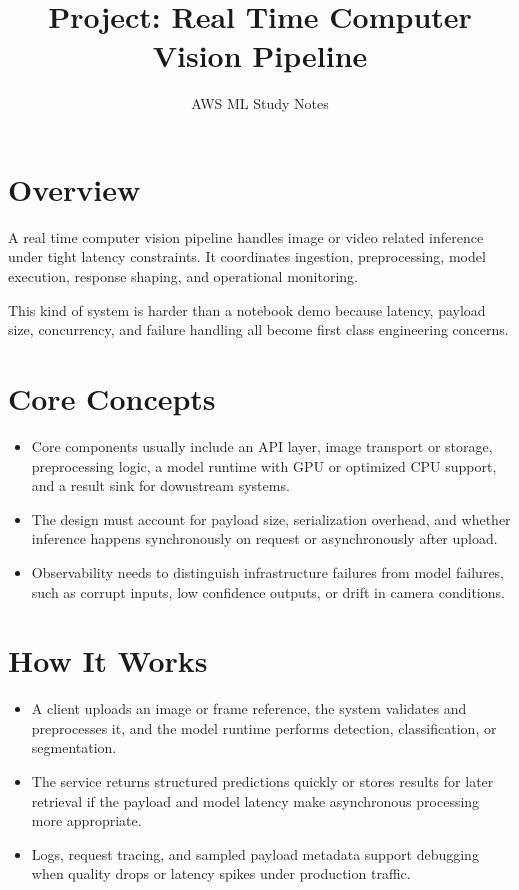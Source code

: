 \documentclass[10pt,twocolumn]{article}
\begin{document}
\title{\vspace{-1.6cm}Project: Real Time Computer Vision Pipeline}
\author{AWS ML Study Notes}
\date{}
\maketitle
\small

\section*{Overview}
A real time computer vision pipeline handles image or video related inference under tight latency constraints. It coordinates ingestion, preprocessing, model execution, response shaping, and operational monitoring.

This kind of system is harder than a notebook demo because latency, payload size, concurrency, and failure handling all become first class engineering concerns.

\section*{Core Concepts}
\begin{itemize}
\item Core components usually include an API layer, image transport or storage, preprocessing logic, a model runtime with GPU or optimized CPU support, and a result sink for downstream systems.
\item The design must account for payload size, serialization overhead, and whether inference happens synchronously on request or asynchronously after upload.
\item Observability needs to distinguish infrastructure failures from model failures, such as corrupt inputs, low confidence outputs, or drift in camera conditions.
\end{itemize}

\section*{How It Works}
\begin{itemize}
\item A client uploads an image or frame reference, the system validates and preprocesses it, and the model runtime performs detection, classification, or segmentation.
\item The service returns structured predictions quickly or stores results for later retrieval if the payload and model latency make asynchronous processing more appropriate.
\item Logs, request tracing, and sampled payload metadata support debugging when quality drops or latency spikes under production traffic.
\end{itemize}
\end{document}

